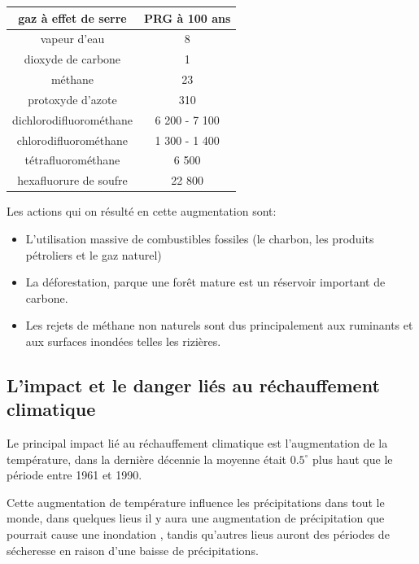 \documentclass[a4paper,11pt]{article}
\begin{document}
\begin{table}[H]
  \begin{center}
    \begin{tabular}{ |c | c|}
      \hline
      gaz à effet de serre &  PRG à 100 ans \\
      \hline 
      \hline 
      vapeur d'eau &  8\\
      dioxyde de carbone  & 1\\
      méthane & 23\\
      protoxyde d'azote  &310\\
      dichlorodifluorométhane  & 6 200 - 7 100\\
      chlorodifluorométhane  & 1 300 - 1 400\\
      tétrafluorométhane &6 500\\
      hexafluorure de soufre & 22 800\\
      \hline
    \end{tabular}

  \end{center}
\end{table}

Les actions qui on résulté en cette augmentation sont:

\begin{itemize}

\item L'utilisation massive de combustibles fossiles (le charbon, les produits
  pétroliers et le gaz naturel)

\item La  déforestation, parque une forêt  mature est un  réservoir important de
  carbone.

\item  Les  rejets  de  méthane non naturels  sont  dus  principalement  aux
  ruminants et aux surfaces inondées telles les rizières.

\end{itemize}



\subsection{L’impact et le danger liés au réchauffement climatique}

Le principal  impact lié  au réchauffement climatique  est l'augmentation  de la
température, dans la dernière décennie  la moyenne était $0.5^{\circ}$ plus haut
que le période entre 1961 et 1990.

Cette  augmentation de température  influence les  précipitations dans  tout le
monde,  dans quelques  lieus il  y aura  une augmentation  de  précipitation que
pourrait cause  une inondation , tandis  qu'autres lieus auront  des périodes de
sécheresse en raison d'une baisse de précipitations.
\end{document}
